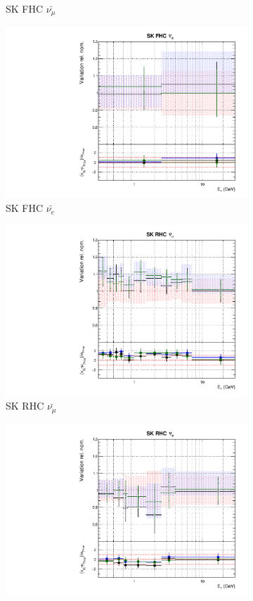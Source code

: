 \begin{figure}
\begin{subfigure}{0.24\textwidth}
  \caption{SK FHC $\bar{\nu_{\mu}}$}
\end{subfigure}
\begin{subfigure}{0.24\textwidth}
  \centering
  \includegraphics[width=0.95\linewidth]{figs/fgdfitsflux_11}
  \caption{SK FHC $\bar{\nu_{e}}$}
\end{subfigure}
\begin{subfigure}{0.24\textwidth}
  \centering
  \includegraphics[width=0.95\linewidth]{figs/fgdfitsflux_12}
  \caption{SK RHC $\bar{\nu_{\mu}}$}
\end{subfigure}
\begin{subfigure}{0.24\textwidth}
  \centering
  \includegraphics[width=0.95\linewidth]{figs/fgdfitsflux_13}

\end{subfigure}
\end{figure}
